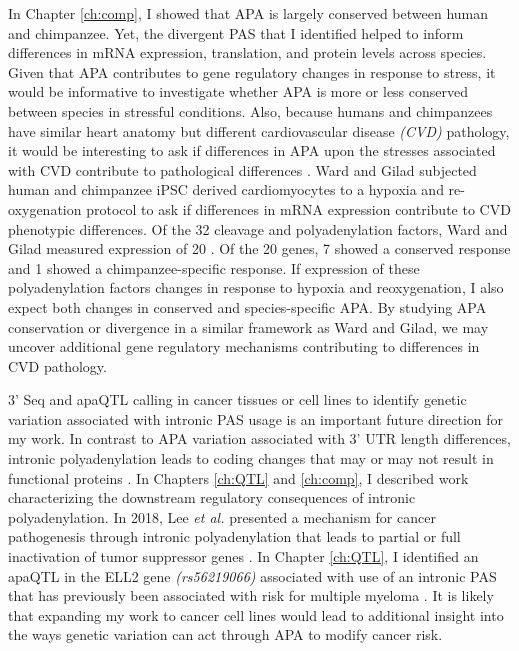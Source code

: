 In Chapter \ref{ch:comp}, I showed that APA is largely conserved between human and chimpanzee. Yet, the divergent PAS that I identified helped to inform differences in mRNA expression, translation, and protein levels across species. Given that APA contributes to gene regulatory changes in response to stress, it would be informative to investigate whether APA is more or less conserved between species in stressful conditions. Also, because humans and chimpanzees have similar heart anatomy but different cardiovascular disease \emph{(CVD)} pathology, it would be interesting to ask if differences in APA upon the stresses associated with CVD contribute to pathological differences \citep{lammey_interstitial_2008, varki_original_2009}. Ward and Gilad subjected human and chimpanzee iPSC derived cardiomyocytes to a hypoxia and re-oxygenation protocol to ask if differences in mRNA expression contribute to CVD phenotypic differences. Of the 32 cleavage and polyadenylation factors, Ward and Gilad measured expression of 20 \citep{sadek_alternative_2019, ward_generally_2019}. Of the 20 genes, 7 showed a conserved response and 1 showed a chimpanzee-specific response. If expression of these polyadenylation factors changes in response to hypoxia and reoxygenation, I also expect both changes in conserved and species-specific APA. By studying APA conservation or divergence in a similar framework as Ward and Gilad, we may uncover additional gene regulatory mechanisms contributing to differences in CVD pathology. 


3' Seq and apaQTL calling in cancer tissues or cell lines to identify genetic variation associated with intronic PAS usage is an important future direction for my work. In contrast to APA variation associated with 3' UTR length differences, intronic polyadenylation leads to coding changes that may or may not result in functional proteins \citep{tian_alternative_2017, vasudevan_non-stop_2002, yao_coding_2012}. In Chapters \ref{ch:QTL} and \ref{ch:comp}, I described work characterizing the downstream regulatory consequences of intronic polyadenylation. In 2018, Lee \emph{et al.} presented a mechanism for cancer pathogenesis through intronic polyadenylation that leads to partial or full inactivation of tumor suppressor genes \citep{lee_widespread_2018}. In Chapter \ref{ch:QTL}, I identified an apaQTL in the ELL2 gene \emph{(rs56219066)} associated with use of an intronic PAS that has previously been associated with risk for multiple myeloma \citep{swaminathan_variants_2015}. It is likely that expanding my work to cancer cell lines would lead to additional insight into the ways genetic variation can act through APA to modify cancer risk.

